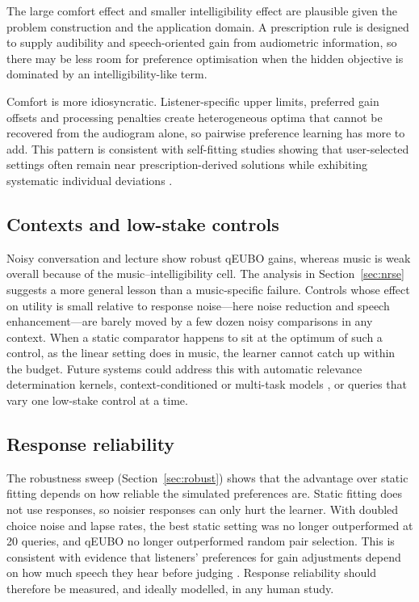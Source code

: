 \documentclass[preprint,12pt]{elsarticle}
\begin{document}
The large comfort effect and smaller intelligibility effect are plausible given the problem construction and the application domain. A prescription rule is designed to supply audibility and speech-oriented gain from audiometric information, so there may be less room for preference optimisation when the hidden objective is dominated by an intelligibility-like term.

Comfort is more idiosyncratic. Listener-specific upper limits, preferred gain offsets and processing penalties create heterogeneous optima that cannot be recovered from the audiogram alone, so pairwise preference learning has more to add. This pattern is consistent with self-fitting studies showing that user-selected settings often remain near prescription-derived solutions while exhibiting systematic individual deviations \cite{dreschler2008,sabin2020}.

\subsection{Contexts and low-stake controls}

Noisy conversation and lecture show robust qEUBO gains, whereas music is weak overall because of the music--intelligibility cell. The analysis in Section~\ref{sec:nrse} suggests a more general lesson than a music-specific failure. Controls whose effect on utility is small relative to response noise---here noise reduction and speech enhancement---are barely moved by a few dozen noisy comparisons in any context. When a static comparator happens to sit at the optimum of such a control, as the linear setting does in music, the learner cannot catch up within the budget. Future systems could address this with automatic relevance determination kernels, context-conditioned or multi-task models \cite{birlutiu2010}, or queries that vary one low-stake control at a time.

\subsection{Response reliability}

The robustness sweep (Section~\ref{sec:robust}) shows that the advantage over static fitting depends on how reliable the simulated preferences are. Static fitting does not use responses, so noisier responses can only hurt the learner. With doubled choice noise and lapse rates, the best static setting was no longer outperformed at 20 queries, and qEUBO no longer outperformed random pair selection. This is consistent with evidence that listeners' preferences for gain adjustments depend on how much speech they hear before judging \cite{whitmer2022}. Response reliability should therefore be measured, and ideally modelled, in any human study.
\end{document}
